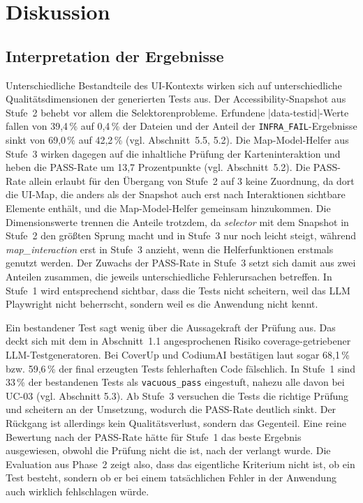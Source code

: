 \newpage
\section{Diskussion}

\subsection{Interpretation der Ergebnisse}

Unterschiedliche Bestandteile des \ac{UI}-Kontexts wirken sich auf unterschiedliche Qualitätsdimensionen der generierten Tests aus. Der Accessibility-Snapshot aus Stufe~2 behebt vor allem die Selektorenprobleme. Erfundene \code|data-testid|-Werte fallen von 39,4\,\% auf 0,4\,\% der Dateien und der Anteil der \texttt{INFRA\_FAIL}-Ergebnisse sinkt von 69,0\,\% auf 42,2\,\% (vgl. Abschnitt~5.5, 5.2). Die Map-Model-Helfer aus Stufe~3 wirken dagegen auf die inhaltliche Prüfung der Karteninteraktion und heben die PASS-Rate um 13,7 Prozentpunkte (vgl. Abschnitt~5.2). Die PASS-Rate allein erlaubt für den Übergang von Stufe~2 auf 3 keine Zuordnung, da dort die \ac{UI}-Map, die anders als der Snapshot auch erst nach Interaktionen sichtbare Elemente enthält, und die Map-Model-Helfer gemeinsam hinzukommen. Die Dimensionswerte trennen die Anteile trotzdem, da \emph{selector} mit dem Snapshot in Stufe~2 den größten Sprung macht und in Stufe~3 nur noch leicht steigt, während \emph{map\_interaction} erst in Stufe~3 anzieht, wenn die Helferfunktionen erstmals genutzt werden. Der Zuwachs der PASS-Rate in Stufe~3 setzt sich damit aus zwei Anteilen zusammen, die jeweils unterschiedliche Fehlerursachen betreffen. In Stufe~1 wird entsprechend sichtbar, dass die Tests nicht scheitern, weil das \ac{LLM} Playwright nicht beherrscht, sondern weil es die Anwendung nicht kennt.

Ein bestandener Test sagt wenig über die Aussagekraft der Prüfung aus. Das deckt sich mit dem in Abschnitt~1.1 angesprochenen Risiko coverage-getriebener \ac{LLM}-Testgeneratoren. Bei CoverUp und CodiumAI bestätigen laut \textcite[S.~4]{mathews_design_2024} sogar 68,1\,\% bzw. 59,6\,\% der final erzeugten Tests fehlerhaften Code fälschlich. In Stufe~1 sind 33\,\% der bestandenen Tests als \texttt{vacuous\_pass} eingestuft, nahezu alle davon bei UC-03 (vgl. Abschnitt 5.3). Ab Stufe~3 versuchen die Tests die richtige Prüfung und scheitern an der Umsetzung, wodurch die PASS-Rate deutlich sinkt. Der Rückgang ist allerdings kein Qualitätsverlust, sondern das Gegenteil. Eine reine Bewertung nach der PASS-Rate hätte für Stufe~1 das beste Ergebnis ausgewiesen, obwohl die Prüfung nicht die ist, nach der verlangt wurde. Die Evaluation aus Phase~2 zeigt also, dass das eigentliche Kriterium nicht ist, ob ein Test besteht, sondern ob er bei einem tatsächlichen Fehler in der Anwendung auch wirklich fehlschlagen würde. 

